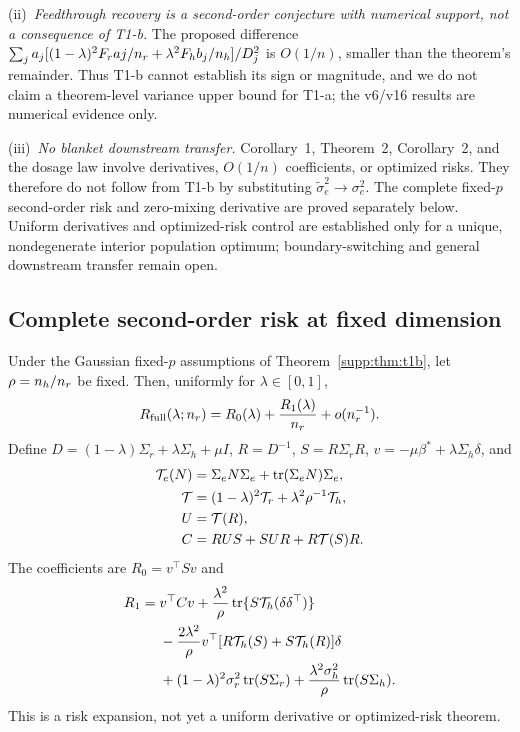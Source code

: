 (ii)~\emph{Feedthrough recovery is a second-order conjecture with numerical support, not a consequence of T1-b.}
The proposed difference $\sum_j a_j[(1-\lambda)^2F_raj/n_r+\lambda^2F_hb_j/n_h]/D_j^2$ is $O(1/n)$, smaller than the theorem's remainder.
Thus T1-b cannot establish its sign or magnitude, and we do not claim a theorem-level variance upper bound for T1-a; the v6/v16 results are numerical evidence only.

(iii)~\emph{No blanket downstream transfer.}
Corollary~1, Theorem~2, Corollary~2, and the dosage law involve derivatives, $O(1/n)$ coefficients, or optimized risks.
They therefore do not follow from T1-b by substituting $\tilde\sigma_e^2\to\sigma_e^2$.
The complete fixed-$p$ second-order risk and zero-mixing derivative are proved separately below. Uniform derivatives and optimized-risk control are established only for a unique, nondegenerate interior population optimum; boundary-switching and general downstream transfer remain open.

\subsection{Complete second-order risk at fixed dimension}

\begin{theorem}\label{supp:thm:t1c}
Under the Gaussian fixed-$p$ assumptions of Theorem~\ref{supp:thm:t1b}, let $\rho=n_h/n_r$ be fixed. Then, uniformly for $\lambda\in[0,1]$,
\begin{equation}
 R_{\mathrm{full}}(\lambda;n_r)=R_0(\lambda)+\frac{R_1(\lambda)}{n_r}+o(n_r^{-1}).
 \label{supp:eq:t1c}
\end{equation}
Define $D=(1-\lambda)\Sigma_r+\lambda\Sigma_h+\mu I$, $R=D^{-1}$, $S=R\Sigma_rR$, $v=-\mu\beta^*+\lambda\Sigma_h\delta$, and
\begin{align}
 \mathcal T_e(N)&=\Sigma_eN\Sigma_e+\operatorname{tr}(\Sigma_eN)\Sigma_e,\notag\\
 \mathcal T&=(1-\lambda)^2\mathcal T_r+\lambda^2\rho^{-1}\mathcal T_h,\notag\\
 U&=\mathcal T(R),\notag\\
 C&=RUS+SUR+R\mathcal T(S)R.
 \label{supp:eq:t1c-matrices}
\end{align}
The coefficients are $R_0=v^\top Sv$ and
\begin{align}
 R_1={}&v^\top Cv+\frac{\lambda^2}{\rho}\operatorname{tr}\{S\mathcal T_h(\delta\delta^\top)\}\notag\\
 &-\frac{2\lambda^2}{\rho}v^\top[R\mathcal T_h(S)+S\mathcal T_h(R)]\delta\notag\\
 &+(1-\lambda)^2\sigma_r^2\operatorname{tr}(S\Sigma_r)
 +\frac{\lambda^2\sigma_h^2}{\rho}\operatorname{tr}(S\Sigma_h).
 \label{supp:eq:t1c-r1}
\end{align}
This is a risk expansion, not yet a uniform derivative or optimized-risk theorem.
\end{theorem}

